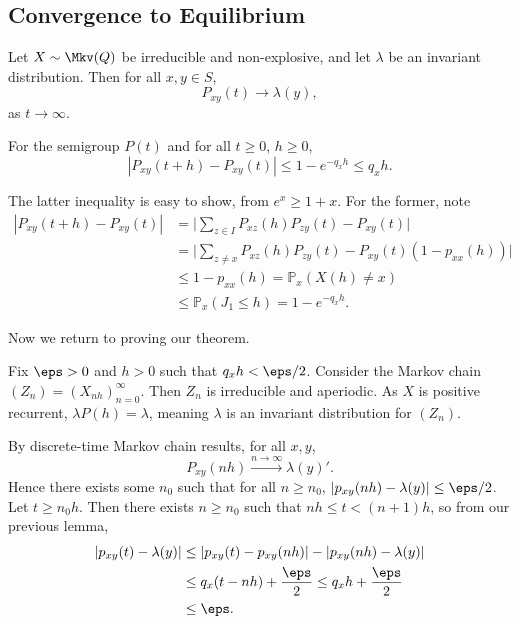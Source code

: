 \documentclass[12pt]{article}
\begin{document}
\subsection{Convergence to Equilibrium}
\label{sub:convergence_to_equilibrium}

\begin{theorem}
	Let $X \sim \Mkv(Q)$ be irreducible and non-explosive, and let $\lambda$ be an invariant distribution. Then for all $x, y \in S$,
	\[
	P_{xy}(t) \to \lambda (y)
	,\]
	as $t \to \infty$.
\end{theorem}

\begin{lemma}
	For the semigroup $P(t)$ and for all $t \geq 0$, $h \geq 0$,
	\[
		|P_{xy}(t+h) - P_{xy}(t)| \leq 1 - e^{-q_x h} \leq q_x h
	.\]
\end{lemma}

\begin{proofbox}
	The latter inequality is easy to show, from $e^{x} \geq 1+x$. For the former, note
	\begin{align*}
		|P_{xy}(t+h) - P_{xy}(t)| &= \biggl| \sum_{z \in I} P_{xz}(h) P_{zy}(t) - P_{xy}(t) \biggr| \\
					  &= \biggl| \sum_{z \neq x} P_{xz}(h) P_{zy}(t) - P_{xy}(t)(1 - p_{x x}(h)) \biggr| \\
					  &\leq 1 - p_{x x}(h) = \mathbb{P}_x(X(h) \neq x) \\
					  &\leq \mathbb{P}_x(J_1 \leq h) = 1 - e^{-q_x h}.
	\end{align*}
\end{proofbox}

Now we return to proving our theorem.

\begin{proofbox}
	Fix $\eps > 0$ and $h > 0$ such that $q_x h < \eps/2$. Consider the Markov chain $(Z_n) = (X_{nh})_{n = 0}^{\infty}$. Then $Z_n$ is irreducible and aperiodic. As $X$ is positive recurrent, $\lambda P(h) = \lambda$, meaning $\lambda$ is an invariant distribution for $(Z_n)$.

	By discrete-time Markov chain results, for all $x, y$,
	\[
		P_{xy}(nh) \overset{n \to \infty}{\to} \lambda(y)'
	.\]
	Hence there exists some $n_0$ such that for all $n \geq n_0$, $|p_{xy}(nh) - \lambda(y)| \leq \eps/2$. Let $t \geq n_0h$. Then there exists $n \geq n_0$ such that $nh \leq t < (n+1)h$, so from our previous lemma,
	\begin{align*}
		|p_{xy}(t) - \lambda(y)| &\leq |p_{xy}(t) - p_{xy}(nh)| - |p_{xy}(nh) - \lambda(y)| \\
					 &\leq q_x(t - nh) + \frac{\eps}{2} \leq q_x h + \frac{\eps}{2} \\
					 &\leq \eps.
	\end{align*}
\end{proofbox}
\end{document}
